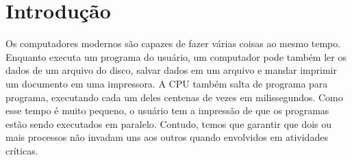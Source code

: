 \chapter{Introdução}

Os computadores modernos são capazes de fazer várias coisas ao mesmo tempo. Enquanto executa um
programa do usuário, um computador pode também ler os dados de um arquivo do disco, salvar dados em um arquivo
e mandar imprimir um documento em uma impressora. A CPU também salta de programa para programa, executando
cada um deles centenas de vezes em milissegundos. Como esse tempo é muito pequeno, o usuário tem a impressão 
de que os programas estão sendo executados em paralelo. Contudo, temos que garantir que dois ou mais processos não
invadam uns aos outros quando envolvidos em atividades críticas.

\cite{muchnick}
